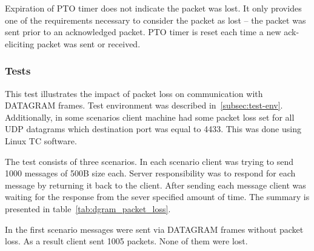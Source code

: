 Expiration of PTO timer does not indicate the packet was lost.
It only provides one of the requirements necessary to consider the packet as lost -- the packet was sent prior to an acknowledged packet.
PTO timer is reset each time a new ack-eliciting packet was sent or received.

\subsubsection{Tests}
This test illustrates the impact of packet loss on communication with DATAGRAM frames.
Test environment was described in~\ref{subsec:test-env}.
Additionally, in some scenarios client machine had some packet loss set for all UDP datagrams which destination port was equal to 4433.
This was done using Linux TC software.

The test consists of three scenarios.
In each scenario client was trying to send 1000 messages of 500B size each.
Server responsibility was to respond for each message by returning it back to the client.
After sending each message client was waiting for the response from the sever specified amount of time.
The summary is presented in table~\ref{tab:dgram_packet_loss}.

\begin{table}
    \centering
    \caption{\label{tab:dgram_packet_loss}Number of packets sent with and without packet loss for DATAGRAM frames.}
\end{table}

In the first scenario messages were sent via DATAGRAM frames without packet loss.
As a result client sent 1005 packets.
None of them were lost.

